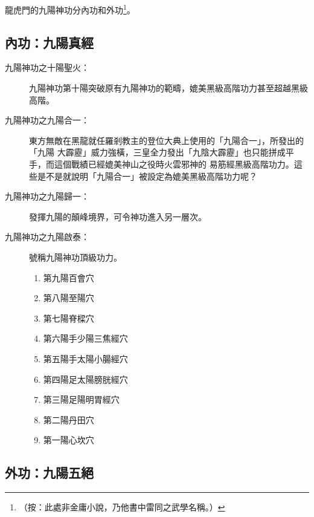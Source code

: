 龍虎門的九陽神功分內功和外功\footnote{（按：此處非金庸小說，乃他書中雷同之武學名稱。）}。

\subsection{內功：九陽真經}

\begin{description}
\item[九陽神功之十陽聖火：]九陽神功第十陽突破原有九陽神功的範疇，媲美黑級高階功力甚至超越黑級高階。
\item[九陽神功之九陽合一：]東方無敵在黑龍就任羅剎教主的登位大典上使用的「九陽合一」，所發出的「九陽
  大霹靂」威力強橫，三皇全力發出「九陰大霹靂」也只能拼成平手，而這個戰績已經媲美神山之役時火雲邪神的
  易筋經黑級高階功力。這些是不是就說明「九陽合一」被設定為媲美黑級高階功力呢？ 
\item[九陽神功之九陽歸一：]發揮九陽的顛峰境界，可令神功進入另一層次。
\item[九陽神功之九陽啟泰：]號稱九陽神功頂級功力。
  \begin{multicols}{2}
    \begin{enumerate}
    \item 第九陽百會穴
    \item 第八陽至陽穴
    \item 第七陽脊樑穴
    \item 第六陽手少陽三焦經穴
    \item 第五陽手太陽小腸經穴
    \item 第四陽足太陽膀胱經穴
    \item 第三陽足陽明胃經穴
    \item 第二陽丹田穴
    \item 第一陽心坎穴
    \end{enumerate}
  \end{multicols}
\end{description}

\subsection{外功：九陽五絕}

